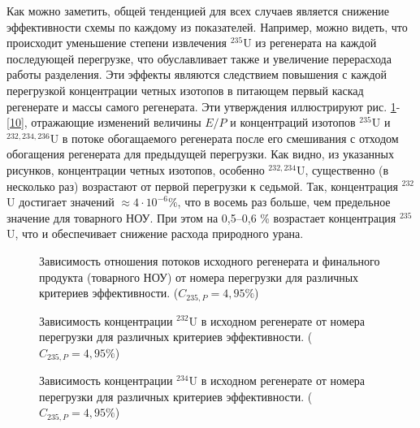 Как можно заметить, общей тенденцией для всех случаев является снижение эффективности схемы по каждому из показателей.
Например, можно видеть, что происходит уменьшение степени извлечения $^{235}$U из регенерата на каждой последующей перегрузке, что обуславливает также и увеличение перерасхода работы разделения.
Эти эффекты являются следствием повышения с каждой перегрузкой концентрации четных изотопов в питающем первый каскад регенерате и массы самого регенерата.
Эти утверждения иллюстрируют рис. \ref{7}-\ref{10}, отражающие изменений величины $E/P$ и концентраций изотопов $^{235}$U и $^{232,234,236}$U в потоке обогащаемого регенерата после его смешивания с отходом обогащения регенерата для предыдущей перегрузки.
Как видно, из указанных рисунков, концентрации четных изотопов, особенно $^{232,234}$U, существенно (в несколько раз) возрастают от первой перегрузки к седьмой. Так, концентрация $^{232}$U достигает значений $\approx 4\cdot10^{-6} \%$, что в восемь раз больше, чем предельное значение для товарного НОУ. При этом на 0,5--0,6 \% возрастает концентрация $^{235}$U, что и обеспечивает снижение расхода природного урана.      

\begin{figure}[h]
    \centering
    
    \caption{Зависимость отношения потоков исходного регенерата и финального продукта (товарного НОУ) от номера перегрузки для различных критериев эффективности. ($C_{235,{P}}=4,95\%$)}\label{7}
\end{figure}

%     

\begin{figure}[h]
    \centering
    \begin{minipage}{.5\textwidth}
      \centering
      
      \caption{{Зависимость концентрации $^{232}$U в исходном регенерате от номера перегрузки для различных критериев эффективности. ($C_{235,{P}}=4,95\%$){\label{8}}}}
    \end{minipage}%
    \begin{minipage}{.5\textwidth}
      \centering
      
\caption{{Зависимость концентрации $^{234}$U в исходном регенерате от номера перегрузки для различных критериев эффективности. ($C_{235,{P}}=4,95\%$){\label{9}}}}
\end{minipage}
\end{figure}

